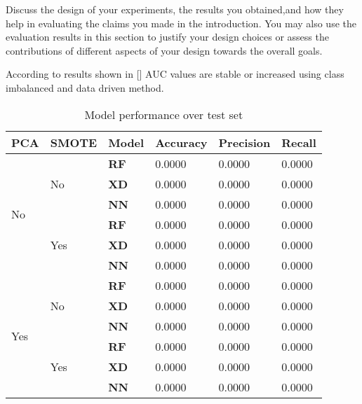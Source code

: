 Discuss the design of your experiments, the results you obtained,and how they help in evaluating the claims you made in the introduction. You may also use the evaluation results in this section to justify your design choices or assess the contributions of different aspects of your design towards the overall goals.



According to results shown in [] AUC values are stable or increased using class imbalanced and data driven method. 



\begin{table}[h]
\begin{tabular}{@{}|l|l|l|l|l|l|@{}}
\toprule
\textbf{PCA} & \textbf{SMOTE} & \textbf{Model} & \textbf{Accuracy} & \textbf{Precision} & \textbf{Recall} \\ \midrule
\multirow{6}{*}{No}  & \multirow{3}{*}{No}  & \textbf{RF} & 0.0000 & 0.0000 & 0.0000 \\ \cmidrule(l){3-6} 
                     &                      & \textbf{XD} & 0.0000 & 0.0000 & 0.0000 \\ \cmidrule(l){3-6} 
                     &                      & \textbf{NN} & 0.0000 & 0.0000 & 0.0000 \\ \cmidrule(l){2-6} 
                     & \multirow{3}{*}{Yes} & \textbf{RF} & 0.0000 & 0.0000 & 0.0000 \\ \cmidrule(l){3-6} 
                     &                      & \textbf{XD} & 0.0000 & 0.0000 & 0.0000 \\ \cmidrule(l){3-6} 
                     &                      & \textbf{NN} & 0.0000 & 0.0000 & 0.0000 \\ \midrule
\multirow{6}{*}{Yes} & \multirow{3}{*}{No}  & \textbf{RF} & 0.0000 & 0.0000 & 0.0000 \\ \cmidrule(l){3-6} 
                     &                      & \textbf{XD} & 0.0000 & 0.0000 & 0.0000 \\ \cmidrule(l){3-6} 
                     &                      & \textbf{NN} & 0.0000 & 0.0000 & 0.0000 \\ \cmidrule(l){2-6} 
                     & \multirow{3}{*}{Yes} & \textbf{RF} & 0.0000 & 0.0000 & 0.0000 \\ \cmidrule(l){3-6} 
                     &                      & \textbf{XD} & 0.0000 & 0.0000 & 0.0000 \\ \cmidrule(l){3-6} 
                     &                      & \textbf{NN} & 0.0000 & 0.0000 & 0.0000 \\ \bottomrule
\end{tabular}
\caption{Model performance over test set}
\label{tab:model performance}
\end{table}